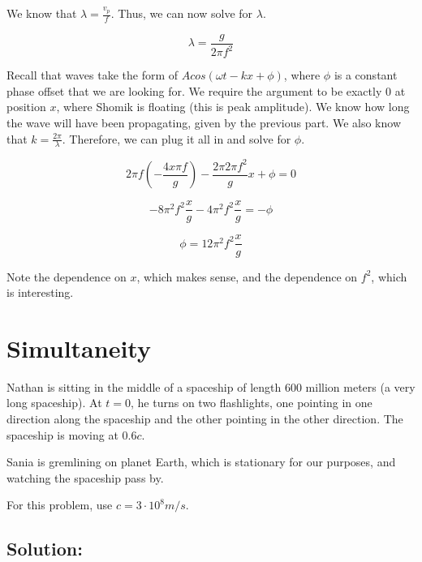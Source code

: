 \documentclass{article}
\begin{document}
We know that $\lambda = \frac{v_p}{f}$. Thus, we can now solve for $\lambda$.

$$\lambda = \frac{g}{2 \pi f^2}$$

Recall that waves take the form of $A cos(\omega t - kx + \phi)$, where $\phi$ is a constant phase offset that we are looking for. We require the argument to be exactly $0$ at position $x$, where Shomik is floating (this is peak amplitude). We know how long the wave will have been propagating, given by the previous part. We also know that $k = \frac{2\pi}{\lambda}$. Therefore, we can plug it all in and solve for $\phi$.

$$2 \pi f \left(-\frac{4x \pi f}{g} \right) - \frac{2\pi 2\pi f^2}{g}x + \phi = 0$$

$$- 8 \pi^2 f^2 \frac{x}{g} - 4 \pi^2 f^2 \frac{x}{g} = -\phi$$

$$\boxed{\phi = 12 \pi^2 f^2 \frac{x}{g}}$$

Note the dependence on $x$, which makes sense, and the dependence on $f^2$, which is interesting.

\vspace{4cm}

\section{Simultaneity}

Nathan is sitting in the middle of a spaceship of length $600$ million meters (a very long spaceship). At $t = 0$, he turns on two flashlights, one pointing in one direction along the spaceship and the other pointing in the other direction. The spaceship is moving at $0.6c$.

Sania is gremlining on planet Earth, which is stationary for our purposes, and watching the spaceship pass by.

For this problem, use $c = 3 \cdot 10^8 m/s$.

\subsection{Solution:}
\end{document}
